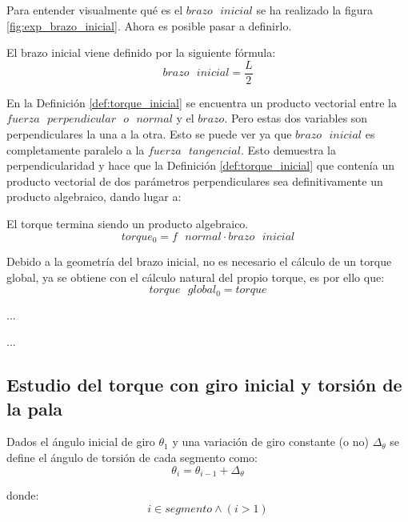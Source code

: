Para entender visualmente qué es el $brazo \text{ } inicial$ se ha realizado la figura \ref{fig:exp_brazo_inicial}. Ahora es posible pasar a definirlo.

\begin{definicion}
El  brazo inicial viene definido por la siguiente fórmula:
$$ brazo \text{ } inicial = \dfrac{L}{2}$$
\end{definicion}
 
 En la Definición \ref{def:torque_inicial} se encuentra un producto vectorial entre la $fuerza  \text{ }perpendicular \text{ } o \text{ } normal$ y el $brazo$. Pero estas dos variables son perpendiculares la una a la otra. Esto se puede ver ya que $brazo \text{ } inicial$ es completamente paralelo a la $fuerza \text{ } tangencial$. Esto demuestra la perpendicularidad y hace que la Definición \ref{def:torque_inicial} que contenía un producto vectorial de dos parámetros perpendiculares sea definitivamente un producto algebraico, dando lugar a:
 
  \begin{definicion}
  El torque termina siendo un producto algebraico.
 $$ torque_0 = f \text{ } normal \cdot brazo \text{ } inicial$$
 \label{def:torque_algebraico_inicial}
 \end{definicion}
 
   \begin{definicion}
Debido a la geometría del brazo inicial, no es necesario el cálculo de un torque global, ya se obtiene con el cálculo natural del propio torque, es por ello que:
 $$ torque \text{ } global_0 = torque$$
 \label{def:torque_global_inicial}
 \end{definicion}
 
 
 ...\vspace{400}
 











...
\subsection{Estudio del torque con giro inicial y torsión de la pala}



\begin{definicion}
Dados el ángulo inicial de giro $\theta_1 $ y una variación de giro constante (o no) $\Delta_\theta$ se define el ángulo de torsión de cada segmento como:
$$\theta_i = \theta_{i-1} + \Delta_\theta$$ 

    donde:
 $$i \in segmento \wedge (i > 1)$$
 
\label{def:theta_cte}
\end{definicion}



